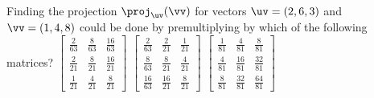 \begin{activity}
Finding the projection \(\proj_\uv(\vv)\) for vectors \(\uv=(2,6,3)\) and \(\vv=(1,4,8)\) could be done by premultiplying by which of the following matrices?
{\(\begin{bmatrix} \frac{2}{63}&\frac{8}{63}&\frac{16}{63}
\\\frac{2}{21}&\frac{8}{21}&\frac{16}{21}
\\\frac{1}{21}&\frac{4}{21}&\frac{8}{21} \end{bmatrix}\)}
{\(\begin{bmatrix} \frac{2}{63}&\frac{2}{21}&\frac{1}{21}
\\\frac{8}{63}&\frac{8}{21}&\frac{4}{21}
\\\frac{16}{63}&\frac{16}{21}&\frac{8}{21} \end{bmatrix}\)}{
\(\begin{bmatrix} \frac{1}{81}&\frac{4}{81}&\frac{8}{81}
\\\frac{4}{81}&\frac{16}{81}&\frac{32}{81}
\\\frac{8}{81}&\frac{32}{81}&\frac{64}{81} \end{bmatrix}\)}
\end{activity}





